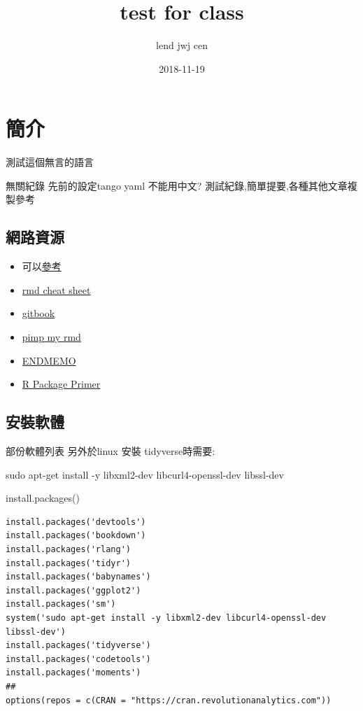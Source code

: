 \documentclass[]{book}
\title{test for class}
\author{lend jwj cen}
\date{2018-11-19}
\newenvironment{Shaded}{\begin{snugshade}}{\end{snugshade}}
\newcommand{\FunctionTok}[1]{\textcolor[rgb]{0.00,0.00,0.00}{#1}}
\newcommand{\NormalTok}[1]{#1}
\providecommand{\tightlist}{%
  \setlength{\itemsep}{0pt}\setlength{\parskip}{0pt}}
\theoremstyle{definition}
\theoremstyle{definition}
\theoremstyle{definition}
\theoremstyle{remark}
\begin{document}
\maketitle

{
\setcounter{tocdepth}{1}
\tableofcontents
}
\chapter{簡介}

測試這個無言的語言

無關紀錄 先前的設定tango yaml 不能用中文?
測試紀錄,簡單提要,各種其他文章複製參考

\section{網路資源}

\begin{itemize}
\tightlist
\item
  可以\href{https://github.com/rstudio/rstudio-conf/tree/master/2017/Advanced\%20R\%20Markdown\%20-\%20Yihui\%20Xie}{參考}
\item
  \href{https://www.rstudio.com/wp-content/uploads/2016/03/rmarkdown-cheatsheet-2.0.pdf}{rmd
  cheat sheet}
\item
  \href{https://www.r-bloggers.com/using-gitbook-with-r-markdown/}{gitbook}
\item
  \href{https://holtzy.github.io/Pimp-my-rmd/\#link}{pimp my rmd}
\item
  \href{http://www.endmemo.com/program/R/grepl.php}{ENDMEMO}
\item
  \href{http://kbroman.org/pkg_primer/}{R Package Primer}
\end{itemize}

\section{安裝軟體}

部份軟體列表 另外於linux 安裝 tidyverse時需要:

\begin{Shaded}
\begin{Highlighting}[]
\FunctionTok{sudo}\NormalTok{ apt-get install -y libxml2-dev libcurl4-openssl-dev libssl-dev}
\end{Highlighting}
\end{Shaded}

install.packages()

\begin{verbatim}
install.packages('devtools')
install.packages('bookdown')
install.packages('rlang')
install.packages('tidyr')
install.packages('babynames')
install.packages('ggplot2')
install.packages('sm')
system('sudo apt-get install -y libxml2-dev libcurl4-openssl-dev libssl-dev')
install.packages('tidyverse')
install.packages('codetools')
install.packages('moments')
##
options(repos = c(CRAN = "https://cran.revolutionanalytics.com"))
\end{verbatim}
\end{document}

